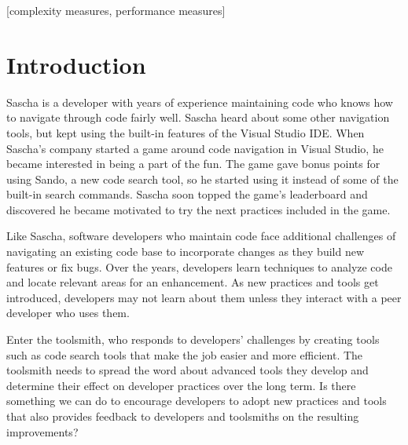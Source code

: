 \documentclass{sig-alternate}
\begin{document}
[complexity measures, performance measures]



\section{Introduction}

Sascha is a developer with years of experience maintaining code who knows how to navigate through code fairly well.  Sascha heard about some other navigation tools, but kept using the built-in features of the Visual Studio IDE.  When Sascha's company started a game around code navigation in Visual Studio, he became interested in being a part of the fun.  The game gave bonus points for using Sando, a new code search tool, so he started using it instead of some of the built-in search commands.  Sascha soon topped the game's leaderboard and discovered he became motivated to try the next practices included in the game. 

Like Sascha, software developers who maintain code face additional challenges of navigating an existing code base to incorporate changes as they build new features or fix bugs.  Over the years, developers learn techniques to analyze code and locate relevant areas for an enhancement.  As new practices and tools get introduced, developers may not learn about them unless they interact with a peer developer who uses them\cite{wbsnipes:Hill2011Peer}.    

Enter the toolsmith,  who responds to developers' challenges by creating tools such as code search tools that make the job easier and more efficient.  The toolsmith needs to spread the word about advanced tools they develop and determine their effect on developer practices over the long term.  Is there something we can do to encourage developers to adopt new practices and tools that also provides feedback to developers and toolsmiths on the resulting improvements?  
\end{document}
